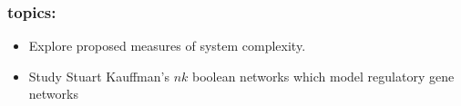 

\begin{frame}
  \frametitle{topics:}

    \begin{block}{}
    \begin{itemize}
    \item 
      Explore proposed measures of system
      complexity.  
    \end{itemize}
    \end{block}

  \begin{block}{}
  \begin{itemize}
  \item
    Study Stuart Kauffman's \alert{$nk$ boolean
      networks} which model regulatory gene networks\cite{kauffman1993a}
  \end{itemize}
  \end{block}

\end{frame}

